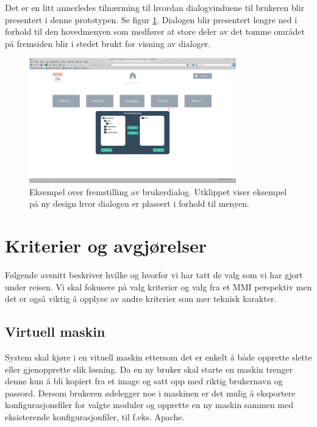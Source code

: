 Det er en litt annerledes tilnærming til hvordan dialogvinduene til brukeren blir presentert i denne prototypen. Se figur \ref{fig:hifi_brukerdialog}. Dialogen blir presentert lengre ned i forhold til den hovedmenyen som medfører at store deler av det tomme området på fremsiden blir i stedet brukt for visning av dialoger. 

\begin{figure}[ht]
\centering
\includegraphics[width=0.8\textwidth,keepaspectratio,trim = {12cm 6cm 12cm 8cm}, clip]{./img/prosessdokumentasjon/hifi/a2.png}
\caption[Hi-fi brukerdialog]{Eksempel over fremstilling av brukerdialog. Utklippet viser eksempel på ny design hvor dialogen er plassert i forhold til menyen.}
\label{fig:hifi_brukerdialog}
\end{figure}

\section{Kriterier og avgjørelser}
Følgende avsnitt beskriver hvilke og hvorfor vi har tatt de valg som vi har gjort under reisen. Vi skal fokusere på valg kriterier og valg fra et MMI perspektiv men det er også viktig å opplyse av andre kriterier som mer teknisk karakter.

\subsection{Virtuell maskin}
System skal kjøre i en vituell maskin ettersom det er enkelt å både opprette slette eller gjenopprette slik løsning. Da en ny bruker skal starte en maskin trenger denne kun å bli kopiert fra et image og satt opp med riktig brukernavn og passord. Dersom brukeren ødelegger noe i maskinen er det mulig å eksportere konfigurasjonsfiler for valgte moduler og opprette en ny maskin sammen med eksisterende konfigurasjonfiler, til f.eks. Apache.


